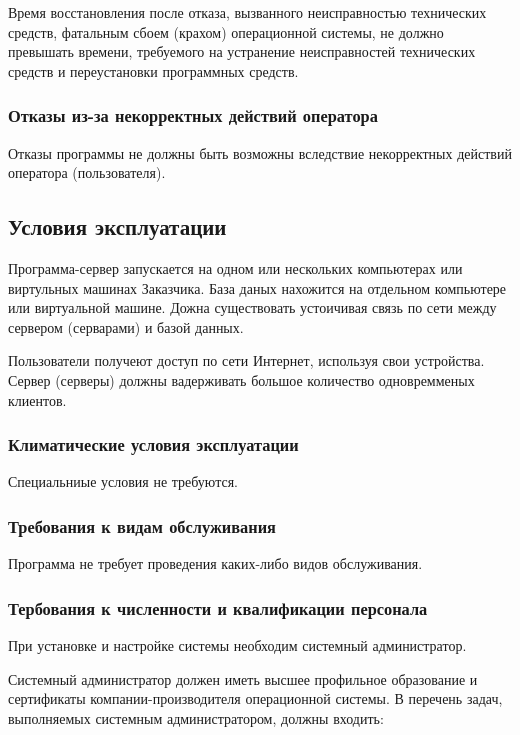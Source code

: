 \documentclass[a4page]{article}
\begin{document}
Время восстановления после отказа, вызванного неисправностью технических средств, фатальным сбоем (крахом) операционной системы, не должно превышать времени, требуемого на устранение неисправностей технических средств и переустановки программных средств.

\subsubsection{Отказы из-за некорректных действий оператора}

Отказы программы не должны быть возможны вследствие некорректных действий оператора (пользователя). 

\subsection{Условия эксплуатации}

Программа-сервер запускается на одном или нескольких компьютерах или виртульных машинах Заказчика. База даных нахожится на отдельном компьютере или виртуальной машине. Дожна существовать устоичивая связь по сети между сервером (серварами) и базой данных.

Пользователи получеют доступ по сети Интернет, используя свои устройства. Сервер (серверы) должны вадерживать большое количество одновремменых клиентов.

\subsubsection{Климатические условия эксплуатации}

Специальниые условия не требуются.

\subsubsection{Требования к видам обслуживания}

Программа не требует проведения каких-либо видов обслуживания.

\subsubsection{Тербования к численности и квалификации персонала}

При установке и настройке системы необходим системный администратор.

Системный администратор должен иметь высшее профильное образование и сертификаты компании-производителя операционной системы. В перечень задач, выполняемых системным администратором, должны входить:
\end{document}
